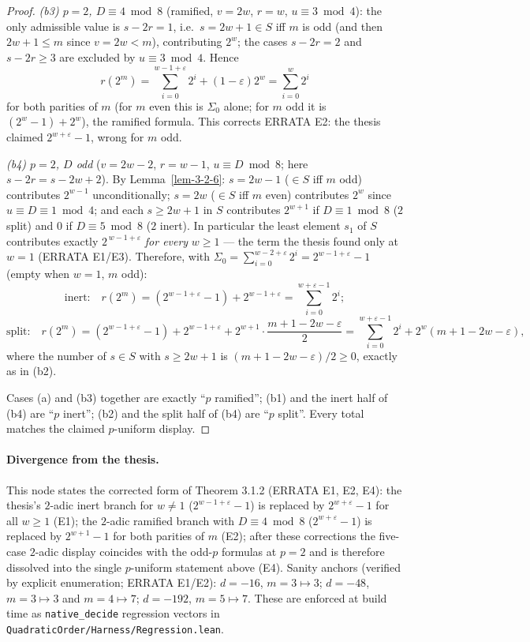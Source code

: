 \begin{proof}
\emph{(b3) $p = 2$, $D \equiv 4 \bmod 8$} (ramified, $v = 2w$, $r = w$,
$u \equiv 3 \bmod 4$): the only admissible value is $s - 2r = 1$, i.e.\
$s = 2w + 1 \in S$ iff $m$ is odd (and then $2w + 1 \leq m$ since $v = 2w < m$),
contributing $2^w$; the cases $s - 2r = 2$ and $s - 2r \geq 3$ are excluded by
$u \equiv 3 \bmod 4$. Hence
\[
r(2^m) = \sum_{i=0}^{w-1+\varepsilon} 2^i + (1 - \varepsilon)2^w
= \sum_{i=0}^{w} 2^i
\]
for both parities of $m$ (for $m$ even this is $\Sigma_0$ alone; for $m$ odd it is
$(2^w - 1) + 2^w$), the ramified formula. This corrects ERRATA E2: the thesis
claimed $2^{w+\varepsilon} - 1$, wrong for $m$ odd.

\emph{(b4) $p = 2$, $D$ odd} ($v = 2w - 2$, $r = w - 1$, $u \equiv D \bmod 8$; here
$s - 2r = s - 2w + 2$). By Lemma~\ref{lem-3-2-6}: $s = 2w - 1$ ($\in S$ iff $m$ odd)
contributes $2^{w-1}$ unconditionally; $s = 2w$ ($\in S$ iff $m$ even) contributes
$2^w$ since $u \equiv D \equiv 1 \bmod 4$; and each $s \geq 2w + 1$ in $S$
contributes $2^{w+1}$ if $D \equiv 1 \bmod 8$ ($2$ split) and $0$ if
$D \equiv 5 \bmod 8$ ($2$ inert). In particular the least element $s_1$ of $S$
contributes exactly $2^{\,w - 1 + \varepsilon}$ \emph{for every} $w \geq 1$ --- the
term the thesis found only at $w = 1$ (ERRATA E1/E3). Therefore, with
$\Sigma_0 = \sum_{i=0}^{w-2+\varepsilon} 2^i = 2^{w-1+\varepsilon} - 1$ (empty when
$w = 1$, $m$ odd):
\[
\text{inert:}\quad
r(2^m) = (2^{w-1+\varepsilon} - 1) + 2^{w-1+\varepsilon}
= \sum_{i=0}^{w+\varepsilon-1} 2^i;
\]
\[
\text{split:}\quad
r(2^m) = (2^{w-1+\varepsilon} - 1) + 2^{w-1+\varepsilon}
+ 2^{w+1}\cdot\frac{m+1-2w-\varepsilon}{2}
= \sum_{i=0}^{w+\varepsilon-1} 2^i + 2^w(m + 1 - 2w - \varepsilon),
\]
where the number of $s \in S$ with $s \geq 2w+1$ is
$(m + 1 - 2w - \varepsilon)/2 \geq 0$, exactly as in (b2).

Cases (a) and (b3) together are exactly ``$p$ ramified''; (b1) and the inert half of
(b4) are ``$p$ inert''; (b2) and the split half of (b4) are ``$p$ split''. Every
total matches the claimed $p$-uniform display.
\end{proof}

\paragraph{Divergence from the thesis.} This node states the corrected form of
Theorem 3.1.2 (ERRATA E1, E2, E4): the thesis's $2$-adic inert branch for
$w \neq 1$ ($2^{w-1+\varepsilon} - 1$) is replaced by $2^{w+\varepsilon} - 1$ for all
$w \geq 1$ (E1); the $2$-adic ramified branch with $D \equiv 4 \bmod 8$
($2^{w+\varepsilon} - 1$) is replaced by $2^{w+1} - 1$ for both parities of $m$ (E2);
after these corrections the five-case $2$-adic display coincides with the odd-$p$
formulas at $p = 2$ and is therefore dissolved into the single $p$-uniform statement
above (E4). Sanity anchors (verified by explicit enumeration; ERRATA E1/E2):
$d = -16$, $m = 3 \mapsto 3$; $d = -48$, $m = 3 \mapsto 3$ and $m = 4 \mapsto 7$;
$d = -192$, $m = 5 \mapsto 7$. These are enforced at build time as
\texttt{native\_decide} regression vectors in
\texttt{QuadraticOrder/Harness/Regression.lean}.
